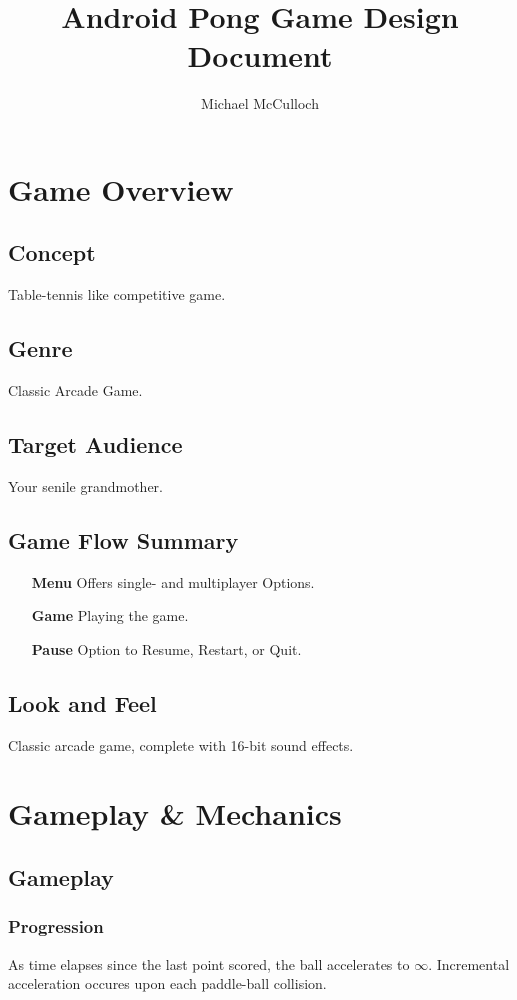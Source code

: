 \documentclass[12pt, letterpaper]{article}
\title{Android Pong Game Design Document}
\author{Michael McCulloch}
\begin{document}
\maketitle
\pagebreak
\tableofcontents
\pagebreak
\section{Game Overview}
    \subsection{Concept}
    Table-tennis like competitive game.
    \subsection{Genre}
    Classic Arcade Game.
    \subsection{Target Audience}
    Your senile grandmother.
    \subsection{Game Flow Summary}
    \begin{itemize}
        \item[\textbf{Menu}] Offers single- and multiplayer Options.
        \item[\textbf{Game}] Playing the game.
        \item[\textbf{Pause}] Option to Resume, Restart, or Quit.
    \end{itemize}
    \subsection{Look and Feel}
    Classic arcade game, complete with 16-bit sound effects.
\section{Gameplay \& Mechanics}
    \subsection{Gameplay}
        \subsubsection{Progression}
        As time elapses since the last point scored, the ball accelerates to $\infty$. Incremental acceleration occures upon each paddle-ball collision.
\end{document}

